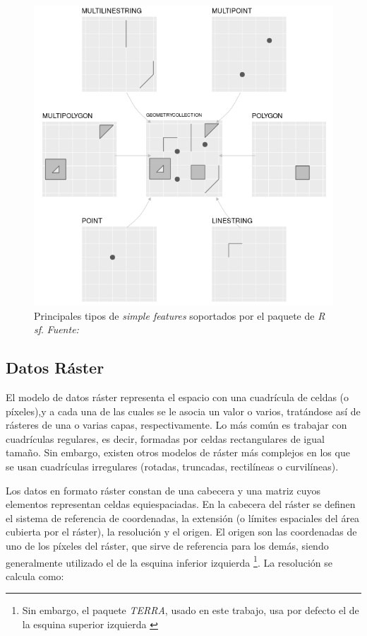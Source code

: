 \documentclass[12pt,a4paper,]{book}
\let\rmarkdownfootnote\footnote%
\def\footnote{\protect\rmarkdownfootnote}
\numberwithin{dummy}{section}
\theoremstyle{ocrenumbox}
\theoremstyle{blacknumex}
\theoremstyle{blacknumbox}
\theoremstyle{ocrenum}
\theoremstyle{ocrenum}
\begin{document}
\begin{figure}[H]

{\centering \includegraphics[width=0.6\linewidth]{graficos/sf-classes} 

}

\caption{Principales tipos de \textit{simple features} soportados por el paquete de \textit{R sf}. \it Fuente: \citet{lovelace_geocomputation_2019}}\label{fig:sf-classes}
\end{figure}

\hypertarget{datos-ruxe1ster}{%
\subsection{Datos Ráster}\label{datos-ruxe1ster}}

El modelo de datos ráster representa el espacio con una cuadrícula de
celdas (o píxeles),y a cada una de las cuales se le asocia un valor o
varios, tratándose así de rásteres de una o varias capas,
respectivamente. Lo más común es trabajar con cuadrículas regulares, es
decir, formadas por celdas rectangulares de igual tamaño. Sin embargo,
existen otros modelos de ráster más complejos en los que se usan
cuadrículas irregulares (rotadas, truncadas, rectilíneas o curvilíneas).
\citep{lovelace_geocomputation_2019}

Los datos en formato ráster constan de una cabecera y una matriz cuyos
elementos representan celdas equiespaciadas. En la cabecera del ráster
se definen el sistema de referencia de coordenadas, la extensión (o
límites espaciales del área cubierta por el ráster), la resolución y el
origen. El origen son las coordenadas de uno de los píxeles del ráster,
que sirve de referencia para los demás, siendo generalmente utilizado el
de la esquina inferior izquierda \footnote{Sin embargo, el paquete
  \emph{TERRA}, usado en este trabajo, usa por defecto el de la esquina
  superior izquierda \citep{terrapackage}}. La resolución se calcula
como:
\end{document}
